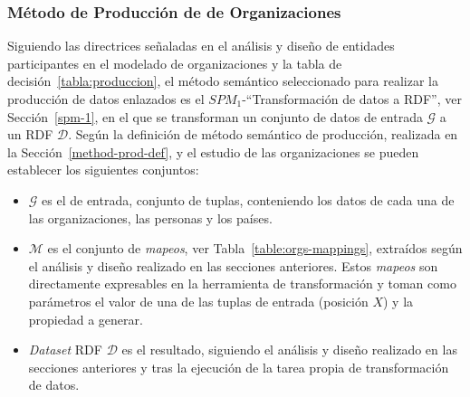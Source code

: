 \newpage

\subsubsection{Método de Producción de \linkeddata de Organizaciones}
Siguiendo las directrices señaladas en el análisis y diseño de entidades 
participantes en el modelado de organizaciones y la tabla de decisión~\ref{tabla:produccion}, el método semántico seleccionado 
para realizar la producción de datos enlazados es el $SPM_1$-``Transformación de datos a RDF'', ver Sección~\ref{spm-1}, en el que 
se transforman un conjunto de datos de entrada $\mathcal{G}$ a un \dataset RDF $\mathcal{D}$. Según la definición de método 
semántico de producción, realizada en la Sección~\ref{method-prod-def}, y el estudio de las organizaciones se pueden 
establecer los siguientes conjuntos:

\begin{itemize}
 \item $\mathcal{G}$ es el \dataset de entrada, conjunto de tuplas, conteniendo los datos de cada una de las organizaciones, las personas y los países. 
 \item $\mathcal{M}$ es el conjunto de \textit{mapeos}, ver Tabla~\ref{table:orgs-mappings}, extraídos según el análisis y diseño realizado en las secciones anteriores. Estos 
\textit{mapeos} son directamente expresables en la herramienta de transformación y toman como parámetros el valor de una de las tuplas de entrada (posición $X$) y la propiedad a generar.
 \item \textit{Dataset} \gls{RDF} $\mathcal{D}$ es el \dataset resultado, siguiendo el análisis y diseño realizado en las secciones anteriores y tras la ejecución 
de la tarea propia de transformación de datos.
\end{itemize}

